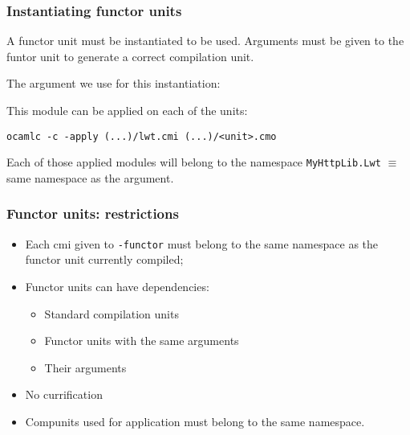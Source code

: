 \documentclass{beamer}
\begin{document}
\begin{frame}[fragile]
\frametitle{Instantiating functor units}

 {
  A functor unit must be instantiated to be used. Arguments must be given to the
  funtor unit to generate a correct compilation unit.
}


 {
  The argument we use for this instantiation:
  \medskip
  \lwtbinding
}

 {
  This module can be applied on each of the units:
  
  \begin{block}{}
    \texttt{ocamlc -c -apply (...)/lwt.cmi (...)/<unit>.cmo}
  \end{block}

  \medskip

  Each of those applied modules will belong to the namespace
  \texttt{MyHttpLib.Lwt} $\equiv$ same namespace as the argument. 
}

\end{frame}


\begin{frame}
\frametitle{Functor units: restrictions}
\begin{itemize}[<+->]
\item Each cmi given to \texttt{-functor} must belong to the same namespace as
  the functor unit currently compiled;
\item Functor units can have dependencies:
  \begin{itemize}
    \item Standard compilation units
    \item Functor units with the \alert{same arguments}
    \item Their arguments
  \end{itemize}
\item No currification
\item Compunits used for application must belong to the same namespace.
\end{itemize}
\end{frame}
\end{document}
